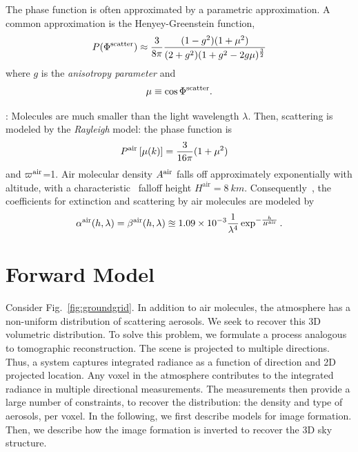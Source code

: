 \documentclass[10pt,twocolumn,letterpaper]{article}
\begin{document}
The phase function is often approximated by a parametric approximation. A common approximation is
the Henyey-Greenstein function,
\begin{align}
  P(\Phi^{\rm scatter})\approx
   \frac{3} {8\pi}
   \frac{(1 - g^2)(1+\mu^2)}
        {(2+g^2)(1 + g^2 - 2g\mu)^\frac{3}{2}}
  \label{eq:aerosol_scatter}
\end{align}
where $g$ is the {\em anisotropy parameter} and
\begin{align}
  \mu\equiv \cos \Phi^{\rm scatter}.
\end{align}

: Molecules are much smaller than the light wavelength $\lambda$. Then, scattering is modeled by the {\em Rayleigh} model: the phase function is
\begin{align}
  P^{\rm air}\left[\mu(k)\right] &= \frac{3}{16\pi}(1+\mu^2)
  \label{eq:rayleighP}
\end{align}
and $\varpi^{\rm air}$=1. Air molecular density $A^{\rm air}$ falls off approximately exponentially with altitude, with
a characteristic~\cite{Levi1980} falloff height $H^\mathrm{air}=8\ km$. Consequently~\cite{Levi1980},
the coefficients for extinction and scattering by air molecules are modeled by
\begin{align}
  \alpha^{\rm air}(h, \lambda)=\beta^{\rm air}(h, \lambda) 
  \approxeq 1.09 \times 10^{-3}
  \frac{1}{\lambda^4}\exp^{-\frac{h}{H^\mathrm{air}}}.
  \label{eq:rayleighbeta}
\end{align}






\section{Forward Model}
\label{sec:skymodel} \vspace{-0.2cm}

Consider Fig.~\ref{fig:groundgrid}. In addition to air molecules, the atmosphere has a non-uniform distribution of scattering aerosols. We seek to recover this 3D volumetric distribution. To solve this problem, we formulate a process analogous to tomographic reconstruction. The scene is projected to multiple directions. Thus, a system captures integrated radiance as a function of direction and 2D projected location. Any voxel in the atmosphere contributes to the integrated radiance in multiple directional measurements. The measurements then provide a large number of constraints, to recover the distribution: the density and type of aerosols, per voxel. In the following, we first describe models for image formation. Then, we describe how the image formation is inverted to recover the 3D sky structure.
\end{document}
